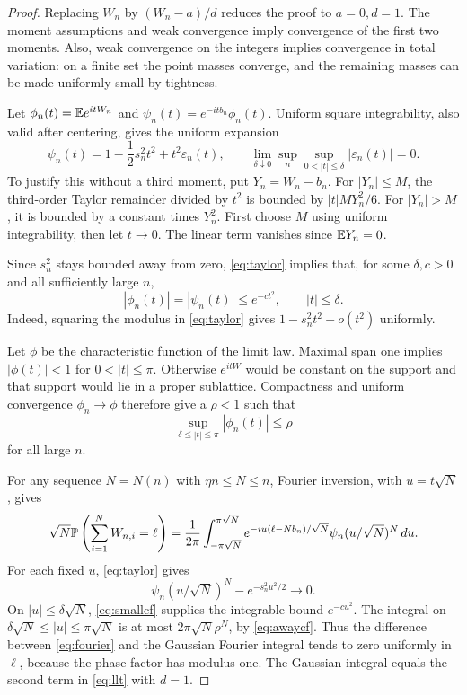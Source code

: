 \begin{proof}
Replacing $W_n$ by $(W_n-a)/d$ reduces the proof to $a=0,d=1$. The moment assumptions and weak convergence imply convergence of the first two moments. Also, weak convergence on the integers implies convergence in total variation: on a finite set the point masses converge, and the remaining masses can be made uniformly small by tightness.

Let $\phi_n(t)=\mathbb E e^{itW_n}$ and $\psi_n(t)=e^{-itb_n}\phi_n(t)$. Uniform square integrability, also valid after centering, gives the uniform expansion
\begin{equation}\label{eq:taylor}
 \psi_n(t)=1-\frac12s_n^2t^2+t^2\varepsilon_n(t),
 \qquad \lim_{\delta\downarrow0}\sup_n\sup_{0<|t|\le\delta}|\varepsilon_n(t)|=0.
\end{equation}
To justify this without a third moment, put $Y_n=W_n-b_n$. For $|Y_n|\le M$, the third-order Taylor remainder divided by $t^2$ is bounded by $|t|M Y_n^2/6$. For $|Y_n|>M$, it is bounded by a constant times $Y_n^2$. First choose $M$ using uniform integrability, then let $t\to0$. The linear term vanishes since $\mathbb E Y_n=0$.

Since $s_n^2$ stays bounded away from zero, \eqref{eq:taylor} implies that, for some $\delta,c>0$ and all sufficiently large $n$,
\begin{equation}\label{eq:smallcf}
 |\phi_n(t)|=|\psi_n(t)|\le e^{-ct^2},\qquad |t|\le\delta.
\end{equation}
Indeed, squaring the modulus in \eqref{eq:taylor} gives $1-s_n^2t^2+o(t^2)$ uniformly.

Let $\phi$ be the characteristic function of the limit law. Maximal span one implies $|\phi(t)|<1$ for $0<|t|\le\pi$. Otherwise $e^{itW}$ would be constant on the support and that support would lie in a proper sublattice. Compactness and uniform convergence $\phi_n\to\phi$ therefore give a $\rho<1$ such that
\begin{equation}\label{eq:awaycf}
 \sup_{\delta\le|t|\le\pi}|\phi_n(t)|\le\rho
\end{equation}
for all large $n$.

For any sequence $N=N(n)$ with $\eta n\le N\le n$, Fourier inversion, with $u=t\sqrt N$, gives
\begin{equation}\label{eq:fourier}
 \sqrt N\mathbb P\left(\sum_{i=1}^NW_{n,i}=\ell\right)
 =\frac1{2\pi}\int_{-\pi\sqrt N}^{\pi\sqrt N}
 e^{-iu(\ell-Nb_n)/\sqrt N}\psi_n(u/\sqrt N)^N\,du.
\end{equation}
For each fixed $u$, \eqref{eq:taylor} gives
\[
 \psi_n(u/\sqrt N)^N-e^{-s_n^2u^2/2}\longrightarrow0.
\]
On $|u|\le\delta\sqrt N$, \eqref{eq:smallcf} supplies the integrable bound $e^{-cu^2}$. The integral on $\delta\sqrt N\le|u|\le\pi\sqrt N$ is at most $2\pi\sqrt N\rho^N$, by \eqref{eq:awaycf}. Thus the difference between \eqref{eq:fourier} and the Gaussian Fourier integral tends to zero uniformly in $\ell$, because the phase factor has modulus one. The Gaussian integral equals the second term in \eqref{eq:llt} with $d=1$.


\end{proof}
